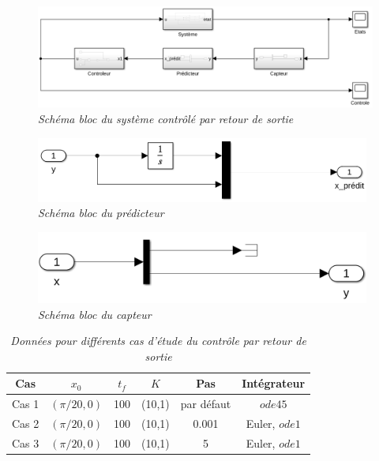 \documentclass[11pt,french]{article} %
\begin{document}
\begin{figure}[H]
    \centering
    \includegraphics[width=12cm]{simulink_capteur_pend_inv.png} 
		\caption{\textit{Schéma bloc du système contrôlé par retour de sortie}}
		\label{fig:simulink_capteur_pend_inv}
\end{figure}
\vspace{0.5cm}

\begin{figure}[H]
    \centering
    \includegraphics[width=11cm]{predicteur_pend_inv.png} 
		\caption{\textit{Schéma bloc du prédicteur}}
		\label{fig:predicteur_pend_inv}
\end{figure}
\vspace{0.5cm}

\begin{figure}[H]
    \centering
    \includegraphics[width=11cm]{capteur_pend_inv.png} 
		\caption{\textit{Schéma bloc du capteur}}
		\label{fig:capteur_pend_inv}
\end{figure}
\vspace{0.5cm}

\begin{table}[h!]
\centering
\begin{tabular}{|c c c c c c|} 
 \hline
 Cas & $x_0$ & $t_f$ & $K$ & Pas & Intégrateur \\ [0.5ex] 
 \hline\hline
 Cas 1 & $(\pi/20,0)$ & 100 & (10,1) & par défaut & $ode45$ \\ 
 Cas 2 & $(\pi/20,0)$ & 100 & (10,1) & 0.001 & Euler, $ode1$ \\
 Cas 3 & $(\pi/20,0)$ & 100 & (10,1) & 5 & Euler, $ode1$ \\ [1ex]
 \hline
\end{tabular}
\caption{\textit{Données pour différents cas d'étude du contrôle par retour de sortie}}
\label{table:2}
\end{table}
\end{document}

